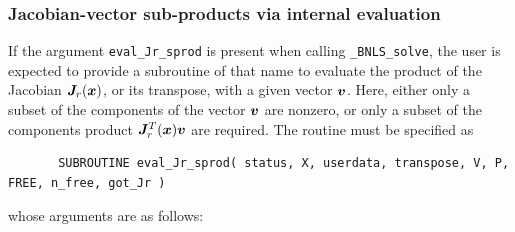\documentclass{galahad}
\newcommand{\packagename}{BNLS}
\newcommand{\fullpackagename}{\libraryname\_\packagename}
\newcommand{\solver}{{\tt \fullpackagename\_solve}}
\begin{document}

\subsubsection{Jacobian-vector sub-products via internal evaluation\label{sjvp}}

If the argument {\tt eval\_Jr\_sprod} is present when calling \solver, the
user is expected to provide a subroutine of that name to evaluate the
product of the Jacobian ${\bm{J}}_r({\bm{x}})$, or its transpose, with a given 
vector ${\bm{v}}$.
Here, either only a subset of the components of the vector ${\bm{v}}$ are nonzero,
or only a subset of the components product ${\bm{J}}_r^T({\bm{x}}) {\bm{v}}$ are required.
The routine must be specified as

\def\baselinestretch{0.8}
{\tt \begin{verbatim}
       SUBROUTINE eval_Jr_sprod( status, X, userdata, transpose, V, P, FREE, n_free, got_Jr )
\end{verbatim} }
\def\baselinestretch{1.0}
\noindent whose arguments are as follows:
\end{document}
